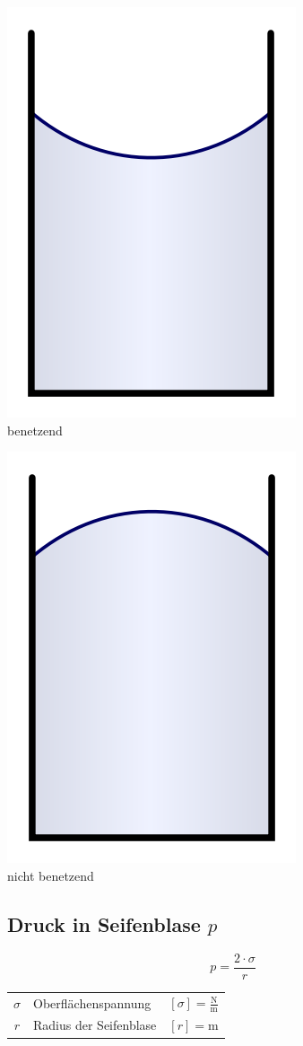 \begin{minipage}{0.48\linewidth}
\includegraphics[width=0.3\linewidth]{Bilder/kapillaritaet_benetzend} \\

benetzend
\end{minipage}
\hfill
\begin{minipage}{0.48\linewidth}
\includegraphics[width=0.3\linewidth]{Bilder/kapillaritaet_nicht_benetzend} \\

nicht benetzend

\end{minipage}




\subsection{Druck in Seifenblase $p$}

$$ \boxed{ p = \frac{2 \cdot \sigma}{r} } $$ 


	\begin{tabular}{c l c}
		\rule{0pt}{8pt}$\sigma$ & Oberflächenspannung & $[\sigma] = \mathrm{\frac{N}{m}}$ \\
		$r$ & Radius der Seifenblase & $[r] = \mathrm{m}$  \\
	\end{tabular}



